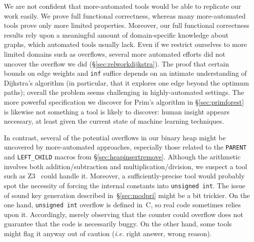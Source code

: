 We are not confident that more-automated tools would be able to replicate our work easily.  We prove full functional correctness, whereas many more-automated tools prove only more limited properties.  Moreover, our full functional correctness results rely upon a meaningful amount of domain-specific knowledge about graphs, which automated tools usually lack.  Even if we restrict ourselves to more limited domains such as overflows, several more automated efforts did not uncover the overflow we did (\S\ref{sec:relworkdijkstra}).  The proof that certain bounds on edge weights and \texttt{inf} suffice depends on an intimate understanding of Dijkstra's algorithm (in particular, that it explores one edge beyond the optimum paths); overall the problem seems challenging in highly-automated settings.  The more powerful specification we discover for Prim's algorithm in \S\ref{sec:primforest} is likewise not something a tool is likely to discover: human insight appears necessary, at least given the current state of machine learning techniques.

In contrast, several of the potential overflows in our binary heap might be uncovered by more-automated approaches, especially those related to the \texttt{PARENT} and \texttt{LEFT\_CHILD} macros from \S\ref{sec:heapinsertremove}.  Although the arithmetic involves both addition/subtraction and multiplication/division, we suspect a tool such as Z3~\cite{moura2008} could handle it.   Moreover, a sufficiently-precise tool would probably spot the necessity of forcing the internal constants into \texttt{unsigned int}.  The issue of sound key generation described in~\S\ref{sec:modpri} might be a bit trickier.  On the one hand, \texttt{unsigned int} overflow is defined in~C, so real code sometimes relies upon it.  Accordingly, merely observing that the counter could overflow does not guarantee that the code is necessarily buggy.  On the other hand, some tools might flag it anyway out of caution (\emph{i.e.} right answer, wrong reason).

